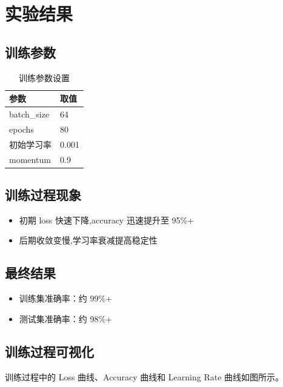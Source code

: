 \section{实验结果}  %

\subsection{训练参数}

\begin{table}[htbp]
\centering
\begin{tabular}{|l|l|}
\hline
\textbf{参数} & \textbf{取值} \\
\hline
batch\_size & 64 \\
epochs & 80 \\
初始学习率 & 0.001 \\
momentum & 0.9 \\
\hline
\end{tabular}
\caption{训练参数设置}
\label{tab:params}
\end{table}

\subsection{训练过程现象}

\begin{itemize}
\item 初期 loss 快速下降,accuracy 迅速提升至 95\%+
\item 后期收敛变慢,学习率衰减提高稳定性
\end{itemize}

\subsection{最终结果}

\begin{itemize}
\item 训练集准确率：约 99\%+
\item 测试集准确率：约 98\%+
\end{itemize}

\subsection{训练过程可视化}

训练过程中的 Loss 曲线、Accuracy 曲线和 Learning Rate 曲线如图所示。

